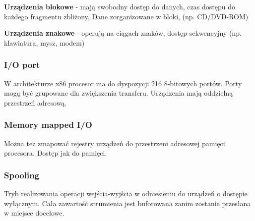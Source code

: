 \textbf{Urządzenia blokowe} - mają swobodny dostęp do danych, czas dostępu do każdego fragmentu zbliżony, Dane zorganizowane w bloki, (np. CD/DVD-ROM)

\textbf{Urządzenia znakowe} - operują na ciągach znaków, dostęp sekwencyjny (np. klawiatura, mysz, modem)
\subsubsection{I/O port}
W architekturze x86 procesor ma do dyspozycji 216 8-bitowych portów. Porty mogą być grupowane dla zwiększenia transferu. Urządzenia mają oddzielną przestrzeń adresową.
\subsubsection{Memory mapped I/O}
Można też zmapować rejestry urządzeń do przestrzeni adresowej pamięci procesora. Dostęp jak do pamięci.
\subsubsection{Spooling}
Tryb realizowania operacji wejścia-wyjścia w odniesieniu do urządzeń o dostępie wyłącznym. Cała zawartość strumienia jest buforowana zanim zostanie przesłana w miejsce docelowe.
